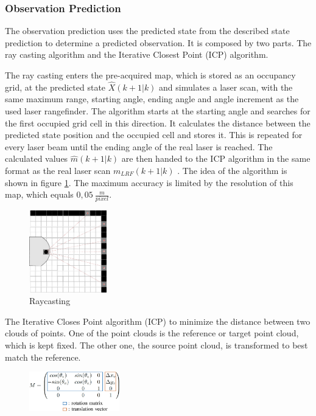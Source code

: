 \subsubsection{Observation Prediction}
\label{subsubsec:Observation_Prediction}
The observation prediction uses the predicted state from the described state prediction to determine a predicted observation.
It is composed by two parts. The ray casting algorithm and the Iterative Closest Point (ICP) algorithm.

The ray casting enters the pre-acquired map, which is stored as an occupancy grid, at the predicted state $\hat{X}(k+1|k)$ and simulates a laser scan, with the same maximum range, starting angle, ending angle and angle increment as the used laser rangefinder. The algorithm starts at the starting angle and searches for the first occupied grid cell in this direction. It calculates the distance between the predicted state position and the occupied cell and stores it. This is repeated for every laser beam until the ending angle of the real laser is reached. The calculated values $\hat{m}(k+1|k)$ are then handed to the ICP algorithm in the same format as the real laser scan $m_{LRF}(k+1|k)$ .
The idea of the algorithm is shown in figure \ref{fig:Raycasting}. The maximum accuracy is limited by the resolution of this map, which equals $0,05~\frac{m}{pixel}$.
\begin{figure}[h!]
\centering
\includegraphics[width=0.3\textwidth]{figures/raycast.pdf}
      \caption{Raycasting}
      \label{fig:Raycasting}
\end{figure}

The Iterative Closes Point algorithm (ICP) to minimize the distance between two clouds of points. One of the point clouds is the reference or target point cloud, which is kept fixed. The other one, the source point cloud, is transformed to best match the reference.
\begin{figure}[h!]
\centering
\includegraphics[width=0.35\textwidth]{figures/M}
      \label{fig:transformation_matrix}
\end{figure}

